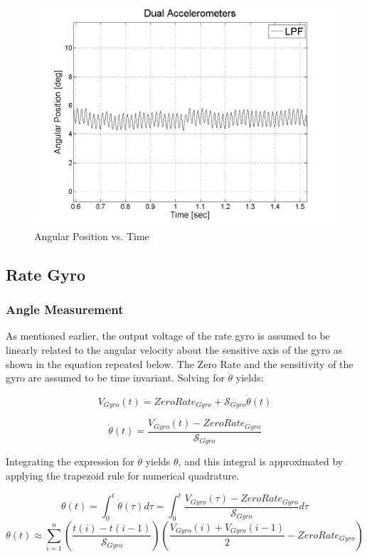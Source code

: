 \documentclass{article}
\theoremstyle{plain}
\theoremstyle{definition}
\theoremstyle{remark}
\newcommand{\Sens}{\mathcal{S}}
\begin{document}
\begin{figure}[hbt]
\begin{center}
\includegraphics[width = 13cm]{Dual_Peak2peak.png}
\caption{Angular Position vs. Time}
\label{Dual_Peak2peak}
\end{center}
\end{figure}

\subsection{Rate Gyro}

\subsubsection{Angle Measurement}

As mentioned earlier, the output voltage of the rate gyro is assumed to be linearly related to the angular velocity about the sensitive axis of the gyro as shown in the equation repeated below.  The Zero Rate and the sensitivity of the gyro are assumed to be time invariant.  Solving for $\dot{\theta}$ yields:

$$V_{Gyro}(t) = ZeroRate_{Gyro} + \Sens_{Gyro} \dot{\theta}(t) $$

$$\dot{\theta}(t) = \frac{V_{Gyro}(t) - ZeroRate_{Gyro}}{\Sens_{Gyro}} $$

Integrating the expression for $\dot{\theta}$ yields $\theta$, and this integral is approximated by applying the trapezoid rule for numerical quadrature.

$$ \theta(t) = \int_0^t \dot{\theta}(\tau) d\tau = \int_0^t \frac{V_{Gyro}(\tau) - ZeroRate_{Gyro}}{\Sens_{Gyro}} d\tau$$
$$ \theta(t) \approx \sum_{i=1}^n \left(\frac{t(i) - t(i-1)}{ \Sens_{Gyro}} \right) \left( \frac{V_{Gyro}(i) + V_{Gyro}(i - 1)}{2} - ZeroRate_{Gyro} \right) $$
\end{document}
